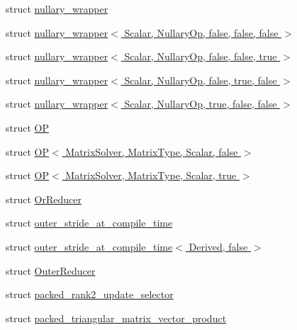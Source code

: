\begin{DoxyCompactItemize}
\item 
struct \hyperlink{struct_eigen_1_1internal_1_1nullary__wrapper}{nullary\+\_\+wrapper}
\item 
struct \hyperlink{struct_eigen_1_1internal_1_1nullary__wrapper_3_01_scalar_00_01_nullary_op_00_01false_00_01false_00_01false_01_4}{nullary\+\_\+wrapper$<$ Scalar, Nullary\+Op, false, false, false $>$}
\item 
struct \hyperlink{struct_eigen_1_1internal_1_1nullary__wrapper_3_01_scalar_00_01_nullary_op_00_01false_00_01false_00_01true_01_4}{nullary\+\_\+wrapper$<$ Scalar, Nullary\+Op, false, false, true $>$}
\item 
struct \hyperlink{struct_eigen_1_1internal_1_1nullary__wrapper_3_01_scalar_00_01_nullary_op_00_01false_00_01true_00_01false_01_4}{nullary\+\_\+wrapper$<$ Scalar, Nullary\+Op, false, true, false $>$}
\item 
struct \hyperlink{struct_eigen_1_1internal_1_1nullary__wrapper_3_01_scalar_00_01_nullary_op_00_01true_00_01false_00_01false_01_4}{nullary\+\_\+wrapper$<$ Scalar, Nullary\+Op, true, false, false $>$}
\item 
struct \hyperlink{struct_eigen_1_1internal_1_1_o_p}{OP}
\item 
struct \hyperlink{struct_eigen_1_1internal_1_1_o_p_3_01_matrix_solver_00_01_matrix_type_00_01_scalar_00_01false_01_4}{O\+P$<$ Matrix\+Solver, Matrix\+Type, Scalar, false $>$}
\item 
struct \hyperlink{struct_eigen_1_1internal_1_1_o_p_3_01_matrix_solver_00_01_matrix_type_00_01_scalar_00_01true_01_4}{O\+P$<$ Matrix\+Solver, Matrix\+Type, Scalar, true $>$}
\item 
struct \hyperlink{struct_eigen_1_1internal_1_1_or_reducer}{Or\+Reducer}
\item 
struct \hyperlink{struct_eigen_1_1internal_1_1outer__stride__at__compile__time}{outer\+\_\+stride\+\_\+at\+\_\+compile\+\_\+time}
\item 
struct \hyperlink{struct_eigen_1_1internal_1_1outer__stride__at__compile__time_3_01_derived_00_01false_01_4}{outer\+\_\+stride\+\_\+at\+\_\+compile\+\_\+time$<$ Derived, false $>$}
\item 
struct \hyperlink{struct_eigen_1_1internal_1_1_outer_reducer}{Outer\+Reducer}
\item 
struct \hyperlink{struct_eigen_1_1internal_1_1packed__rank2__update__selector}{packed\+\_\+rank2\+\_\+update\+\_\+selector}
\item 
struct \hyperlink{struct_eigen_1_1internal_1_1packed__triangular__matrix__vector__product}{packed\+\_\+triangular\+\_\+matrix\+\_\+vector\+\_\+product}

\end{DoxyCompactItemize}
